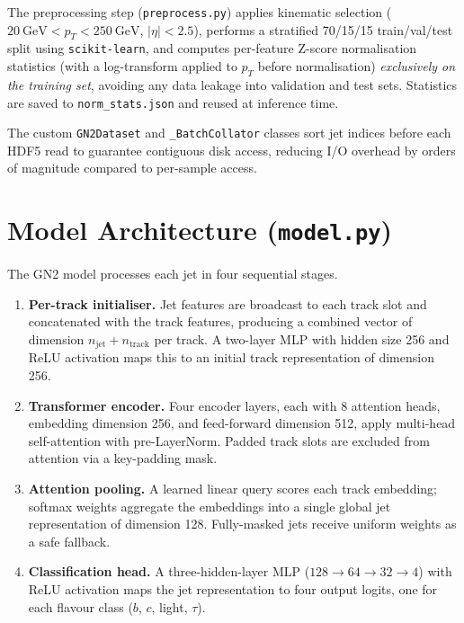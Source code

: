 \documentclass[11pt,a4paper]{article}
\begin{document}
The preprocessing step (\texttt{preprocess.py}) applies kinematic selection
($20~\text{GeV} < p_T < 250~\text{GeV}$, $|\eta| < 2.5$), performs a
stratified 70/15/15 train/val/test split using \texttt{scikit-learn},
and computes per-feature Z-score normalisation statistics
(with a log-transform applied to $p_T$ before normalisation)
\emph{exclusively on the training set}, avoiding any data leakage into
validation and test sets.
Statistics are saved to \texttt{norm\_stats.json} and reused at inference time.

The custom \texttt{GN2Dataset} and \texttt{\_BatchCollator} classes sort
jet indices before each HDF5 read to guarantee contiguous disk access,
reducing I/O overhead by orders of magnitude compared to per-sample access.

\section{Model Architecture (\texttt{model.py})}

The GN2 model processes each jet in four sequential stages.

\begin{enumerate}[leftmargin=*, itemsep=3pt, topsep=3pt]
  \item \textbf{Per-track initialiser.}
    Jet features are broadcast to each track slot and concatenated with the
    track features, producing a combined vector of dimension
    $n_\text{jet} + n_\text{track}$ per track.
    A two-layer MLP with hidden size 256 and ReLU activation maps this to
    an initial track representation of dimension 256.

  \item \textbf{Transformer encoder.}
    Four encoder layers, each with 8 attention heads, embedding dimension 256,
    and feed-forward dimension 512, apply multi-head self-attention with
    pre-LayerNorm.
    Padded track slots are excluded from attention via a key-padding mask.

  \item \textbf{Attention pooling.}
    A learned linear query scores each track embedding;
    softmax weights aggregate the embeddings into a single global jet
    representation of dimension 128.
    Fully-masked jets receive uniform weights as a safe fallback.

  \item \textbf{Classification head.}
    A three-hidden-layer MLP ($128 \to 64 \to 32 \to 4$) with ReLU activation
    maps the jet representation to four output logits,
    one for each flavour class ($b$, $c$, light, $\tau$).
\end{enumerate}
\end{document}
